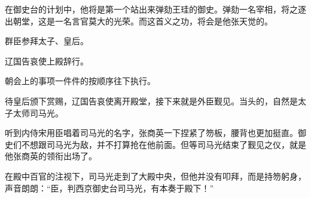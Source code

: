 在御史台的计划中，他将是第一个站出来弹劾王珪的御史。弹劾一名宰相，将之逐出朝堂，这是一名言官莫大的光荣。而这首义之功，将会是他张天觉的。

群臣参拜太子、皇后。

辽国告哀使上殿辞行。

朝会上的事项一件件的按顺序往下执行。

待皇后颁下赏赐，辽国告哀使离开殿堂，接下来就是外臣觐见。当头的，自然是太子太师司马光。

听到内侍宋用臣唱着司马光的名字，张商英一下捏紧了笏板，腰背也更加挺直。御史们不想跟司马光为敌，并不打算抢在他前面。但等司马光结束了觐见之仪，就是他张商英的领衔出场了。

在殿中百官的注视下，司马光走到了大殿中央，但他并没有叩拜，而是持笏躬身，声音朗朗：“臣，判西京御史台司马光，有本奏于殿下！”